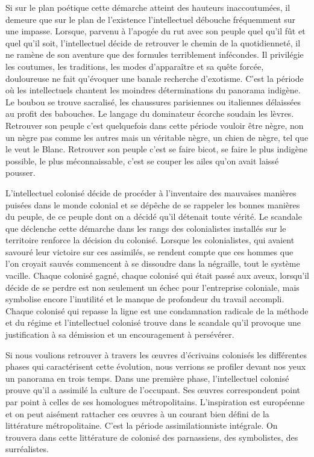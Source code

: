 \documentclass[french,twoside]{book} %
\begin{document}
\bigbreak
\noindent Si sur le plan poétique cette démarche atteint des hauteurs inaccoutumées, il demeure que sur le plan de l’existence l’intellectuel débouche fréquemment sur une impasse. Lorsque, parvenu à l’apogée du rut avec son peuple quel qu’il fût et quel qu’il soit, l’intellectuel décide de retrouver le chemin de la quotidienneté, il ne ramène de son aventure que des formules terriblement infécondes. Il privilégie les coutumes, les traditions, les modes d’apparaître et sa quête forcée, douloureuse ne fait qu’évoquer une banale recherche d’exotisme. C’est la période où les intellectuels chantent les moindres déterminations du panorama indigène. Le boubou se trouve sacralisé, les chaussures parisiennes ou italiennes délaissées au profit des babouches. Le langage du dominateur écorche soudain les lèvres. Retrouver son peuple c’est quelquefois dans cette période vouloir être nègre, non un nègre pas comme les autres mais un véritable nègre, un chien de nègre, tel que le veut le Blanc. Retrouver son peuple c’est se faire bicot, se faire le plus indigène possible, le plus méconnaissable, c’est se couper les ailes qu’on avait laissé pousser.\par
\bigbreak
\noindent L’intellectuel colonisé décide de procéder à l’inventaire des mauvaises manières puisées dans le monde colonial et se dépêche de se rappeler les bonnes manières du peuple, de ce peuple dont on a décidé qu’il détenait toute vérité. Le scandale que déclenche cette démarche dans les rangs des colonialistes installés sur le territoire renforce la décision du colonisé. Lorsque les colonialistes, qui avaient savouré leur victoire sur ces assimilés, se rendent compte que ces hommes que l’on croyait sauvés commencent à se dissoudre dans la négraille, tout le système vacille. Chaque colonisé gagné, chaque colonisé qui était passé aux aveux, lorsqu’il décide de se perdre est non seulement un échec pour l’entreprise coloniale, mais symbolise encore l’inutilité et le manque de profondeur du travail accompli.   Chaque colonisé qui repasse la ligne est une condamnation radicale de la méthode et du régime et l’intellectuel colonisé trouve dans le scandale qu’il provoque une justification à sa démission et un encouragement à persévérer.\par
\bigbreak
\noindent Si nous voulions retrouver à travers les œuvres d’écrivains colonisés les différentes phases qui caractérisent cette évolution, nous verrions se profiler devant nos yeux un panorama en trois temps. Dans une première phase, l’intellectuel colonisé prouve qu’il a assimilé la culture de l’occupant. Ses œuvres correspondent point par point à celles de ses homologues métropolitains. L’inspiration est européenne et on peut aisément rattacher ces œuvres à un courant bien défini de la littérature métropolitaine. C’est la période assimilationniste intégrale. On trouvera dans cette littérature de colonisé des parnassiens, des symbolistes, des surréalistes.\par
\end{document}
